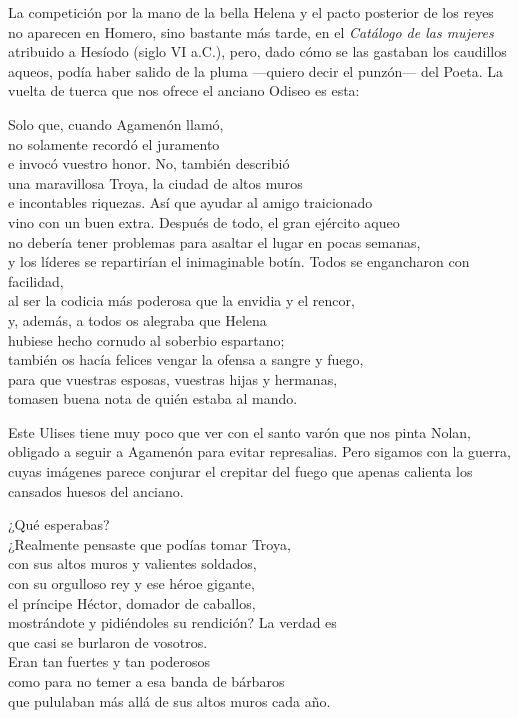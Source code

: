 La competición por la mano de la bella Helena y el pacto posterior de los reyes no aparecen en Homero, sino bastante más tarde, en el \emph{Catálogo de las mujeres} atribuido a Hesíodo (siglo VI a.C.), pero, dado cómo se las gastaban los caudillos aqueos, podía haber salido de la pluma ---quiero decir el punzón--- del Poeta. La vuelta de tuerca que nos ofrece el anciano Odiseo es esta:
%

\begin{versopropio}
Solo que, cuando Agamenón llamó,\\
no solamente recordó el juramento\\
e invocó vuestro honor. No, también describió\\
una maravillosa Troya, la ciudad de altos muros\\
e incontables riquezas. Así que ayudar al amigo traicionado\\
vino con un buen extra. Después de todo, el gran ejército aqueo\\
no debería tener problemas para asaltar el lugar en pocas semanas,\\
y los líderes se repartirían el inimaginable botín.
\stanzabreak
Todos se engancharon con facilidad,\\
al ser la codicia más poderosa que la envidia y el rencor,\\
y, además, a todos os alegraba que Helena\\
hubiese hecho cornudo al soberbio espartano;\\
también os hacía felices vengar la ofensa a sangre y fuego,\\
para que vuestras esposas, vuestras hijas y hermanas,\\
tomasen buena nota de quién estaba al mando.
\end{versopropio}

Este Ulises tiene muy poco que ver con el santo varón que nos pinta Nolan, obligado a seguir a Agamenón para evitar represalias. Pero sigamos con la guerra, cuyas imágenes parece conjurar el crepitar del fuego que apenas calienta los cansados huesos del anciano.

\begin{versopropio}
¿Qué esperabas?\\
¿Realmente pensaste que podías tomar Troya,\\
con sus altos muros y valientes soldados,\\
con su orgulloso rey y ese héroe gigante,\\
el príncipe Héctor, domador de caballos,\\
mostrándote y pidiéndoles su rendición?
\stanzabreak
La verdad es\\
que casi se burlaron de vosotros.\\
Eran tan fuertes y tan poderosos\\
como para no temer a esa banda de bárbaros\\
que pululaban más allá de sus altos muros cada año.
\end{versopropio}

